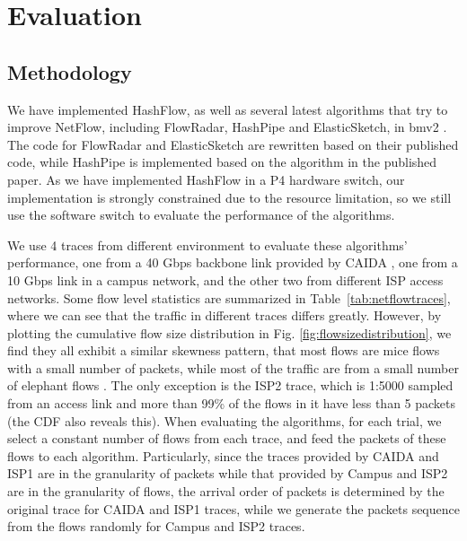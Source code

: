 \section{Evaluation}
\label{section:evaluation}

\subsection{Methodology}\label{methodology}
We have implemented HashFlow, as well as several latest algorithms that try to improve NetFlow, 
including  FlowRadar\cite{li_flowradar:_2016}, HashPipe\cite{sivaraman_heavy-hitter_2017} 
and ElasticSketch\cite{yang_elastic_2018}, in bmv2 \cite{noauthor_bmv2:_2018}. 
The code for FlowRadar and ElasticSketch are rewritten based on their published code, 
while HashPipe is implemented based on the algorithm in the published paper. As we have implemented HashFlow in a P4 hardware switch\cite{noauthor_edgecore_nodate}, our implementation is strongly constrained due to the resource limitation, so we still use the software switch to evaluate the performance of the algorithms.

We use 4 traces from different environment to evaluate these algorithms' performance, 
one from a 40 Gbps backbone link provided by CAIDA \cite{noauthor_caida_nodate},
one from a 10 Gbps link in a campus network, and the other two from different ISP access networks.
Some flow level statistics are summarized in Table~\ref{tab:netflowtraces}, 
where we can see that the traffic in different traces differs greatly.
However, by plotting the cumulative flow size distribution in Fig. \ref{fig:flowsizedistribution}, 
we find they all exhibit a similar skewness pattern, 
that most flows are mice flows with a small number of packets, 
while most of the traffic are from a small number of elephant flows \cite{benson_network_2010}.
The only exception is the ISP2 trace, which is 1:5000 sampled from an access link and 
more than 99\% of the flows in it have less than 5 packets (the CDF also reveals this).
When evaluating the algorithms, for each trial, we select a constant number of flows from each trace, 
and feed the packets of these flows to each algorithm. Particularly, since the traces provided by CAIDA and ISP1 are in the granularity of packets while that provided by Campus and ISP2 are in the granularity of flows, the arrival order of packets is determined by the original trace for CAIDA and ISP1 traces, while we generate the packets sequence from the flows randomly for Campus and ISP2 traces.

